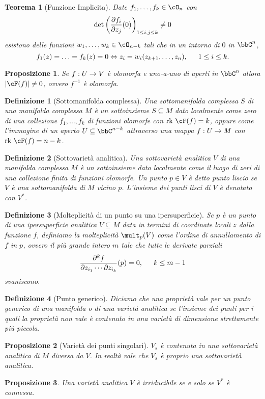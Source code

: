 \documentclass[a4paper,11pt]{article}
\newtheorem{teorema}{Teorema}
\newtheorem{definizione}{Definizione}
\newtheorem{proposizione}{Proposizione}
\begin{document}
\begin{teorema}[Funzione Implicita]
  Date $f_1, \ldots, f_k \in \cO_n$ con
  $$ \det \lrt{\dpar{f_i}{z_j} (0)}_{1 \le i, j \le k} \neq 0 $$
  esistono delle funzioni $w_1, \ldots, w_k \in \cO_{n-k}$ tali che in un intorno di $0$ in $\bbC^n$,
  $$ f_1(z) = \ldots = f_k(z) = 0 \Leftrightarrow z_i = w_i(z_{k+1}, \ldots, z_n), \hskip 1.5em 1 \le i \le k. $$
\end{teorema}

\begin{proposizione}
  Se $f: U \rightarrow V$ è olomorfa e uno-a-uno di aperti in $\bbC^n$ allora $\abs{\cF(f)} \neq 0$, ovvero $f^{-1}$ è olomorfa.
\end{proposizione}

\begin{definizione}[Sottomanifolda complessa]
  Una sottomanifolda complessa $S$ di una manifolda complessa $M$ è un sottoinsieme $S \subseteq M$ dato localmente come zero di una collezione $f_1, \ldots, f_k$ di funzioni olomorfe con $\Rk \cF(f) = k$, oppure come l'immagine di un aperto $U \subseteq \bbC^{n-k}$ attraverso una mappa $f: U \rightarrow M$ con $\Rk \cF(f) = n - k$.
\end{definizione}

\begin{definizione}[Sottovarietà analitica]
  Una sottovarietà analitica $V$ di una manifolda complessa $M$ è un sottoinsieme dato localmente come il luogo di zeri di una collezione finita di funzioni olomorfe.
  Un punto $p \in V$ è detto punto liscio se $V$ è una sottomanifolda di $M$ vicino $p$.
  L'insieme dei punti lisci di $V$ è denotato con $V^*$.
\end{definizione}

\begin{definizione}[Molteplicità di un punto su una ipersuperficie]
  Se $p$ è un punto di una ipersuperficie analitica $V \subseteq M$ data in termini di coordinate locali $z$ dalla funzione $f$, definiamo la molteplicità $\mult_p (V)$ come l'ordine di annullamento di $f$ in $p$, ovvero il più grande intero $m$ tale che tutte le derivate parziali
  $$ \frac{\partial^k f}{\partial z_{i_1} \cdots \partial z_{i_k}} (p) = 0, \hskip 1.5em k \le m - 1 $$
  svaniscono.
\end{definizione}

\begin{definizione}[Punto generico]
  Diciamo che una proprietà vale per un punto generico di una manifolda o di una varietà analitica se l'insieme dei punti per i quali la proprietà non vale è contenuto in una varietà di dimensione strettamente più piccola.
\end{definizione}

\begin{proposizione}[Varietà dei punti singolari]
  $V_s$ è contenuta in una sottovarietà analitica di $M$ diversa da $V$.
  In realtà vale che $V_s$ è proprio una sottovarietà analitica.
\end{proposizione}

\begin{proposizione}
  Una varietà analitica $V$ è irriducibile se e solo se $V^*$ è connessa.
\end{proposizione}
\end{document}
